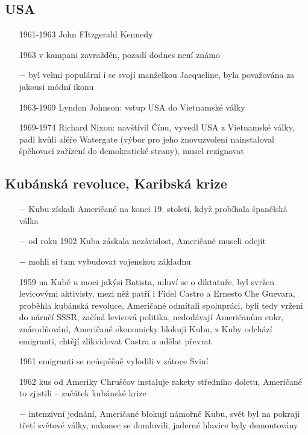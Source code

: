 \documentclass{article}
\begin{document}
\subsection*{USA}
\begin{itemize}
    \vspace{-0.5em}
    \setlength\itemsep{0.15em}
    \item[1961-1963] John FItzgerald Kennedy
    \item[1963] v kampani zavražděn, pozadí dodnes není známo
    \item[$-$] byl velmi populární i se svojí manželkou Jacqueline, byla považována za jakousi módní ikonu
    \item[1963-1969] Lyndon Johnson: vstup USA do Vietnamské války
    \item[1969-1974] Richard Nixon: navštívil Čínu, vyvedl USA z Vietnamské války, padl kvůli aféře Watergate (výbor pro jeho znovuzvolení nainstaloval špěhovací zařízení do demokratické strany), musel rezignovat
\end{itemize}


\subsection*{Kubánská revoluce, Karibská krize}
\begin{itemize}
    \vspace{-0.5em}
    \setlength\itemsep{0.15em}
    \item[$-$] Kubu získali Američané na konci 19. století, když probíhala španělská válka
    \item[$-$] od roku 1902 Kuba záskala nezávislost, Američané museli odejít
    \item[$-$] mohli si tam vybudovat vojenskou základnu
    \item[1959] na Kubě u moci jakýsi Batista, mluví se o diktatuře, byl svržen levicovými aktivisty, mezi něž patří i Fidel Castro a Ernesto Che Guevara, proběhla kubánská revoluce, Američané odmítali spolupráci, byli tedy vrženi do náručí SSSR, začíná levicová politika, nedodávají Američanům cukr, znárodňování, Američané ekonomicky blokují Kubu, z Kuby odchází emigranti, chtějí zlikvidovat Castra a udělat převrat
    \item[1961] emigranti se neúspěšně vylodili v zátoce Sviní
    \item[1962] kus od Ameriky Chruščov instaluje rakety středního doletu, Američané to zjistili -- začátek kubánské krize
    \item[$-$] intenzivní jednání, Američané blokují námořně Kubu, svět byl na pokraji třetí světové války, nakonec se domluvili, jaderné hlavice byly demontovány
\end{itemize}
\end{document}
